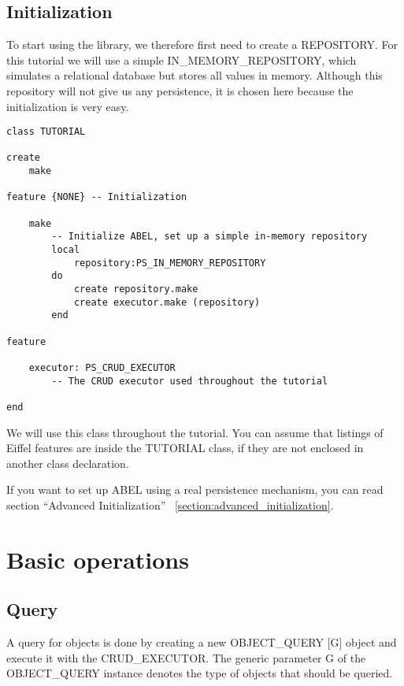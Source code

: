 \subsection{Initialization}

To start using the library, we therefore first need to create a REPOSITORY.
For this tutorial we will use a simple IN\_MEMORY\_REPOSITORY, which simulates a relational database but stores all values in memory.
Although this repository will not give us any persistence, it is chosen here because the initialization is very easy.


\begin{lstlisting}[language=OOSC2Eiffel, captionpos=b, caption={The TUTORIAL class}, label={lst:tutorial_class}]
class TUTORIAL

create
	make

feature {NONE} -- Initialization

	make
		-- Initialize ABEL, set up a simple in-memory repository
		local
			repository:PS_IN_MEMORY_REPOSITORY
		do
			create repository.make
			create executor.make (repository)
		end

feature
	
	executor: PS_CRUD_EXECUTOR
		-- The CRUD executor used throughout the tutorial

end
\end{lstlisting}

We will use this class throughout the tutorial. You can assume that listings of Eiffel features are inside the TUTORIAL class, if they are not enclosed in another class declaration.

If you want to set up ABEL using a real persistence mechanism, you can read section ``Advanced Initialization'' ~\ref{section:advanced_initialization}.

\section{Basic operations}

\subsection{Query}

A query for objects is done by creating a new OBJECT\_QUERY [G] object and execute it with the CRUD\_EXECUTOR.
The generic parameter G of the OBJECT\_QUERY instance denotes the type of objects that should be queried.

